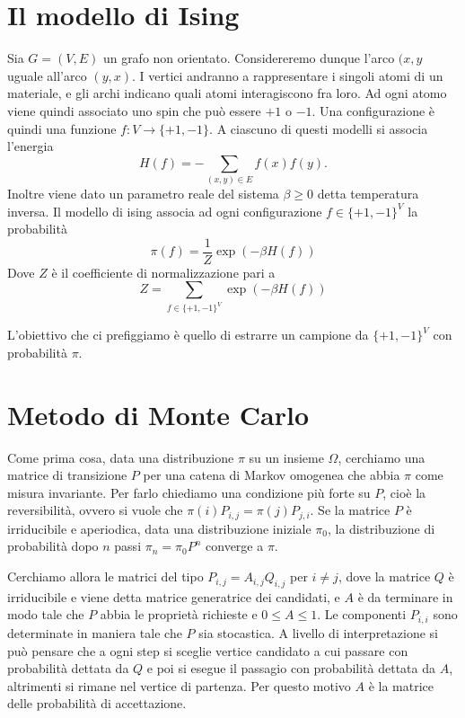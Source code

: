 \documentclass[]{marticle}
\begin{document}
\section{Il modello di Ising}
Sia $G=(V,E)$ un grafo non orientato. Considereremo dunque l'arco $(x,y$ uguale
all'arco $(y,x)$. I vertici andranno a rappresentare i singoli atomi di un
materiale, e gli archi indicano quali atomi interagiscono fra loro. Ad ogni
atomo viene quindi associato uno spin che pu\`o essere $+1$ o $-1$. Una
configurazione \`e quindi una funzione $f\colon V \rightarrow \{+1, -1\}$. A
ciascuno di questi modelli si associa l'energia 
\[
    H(f) = -\sum_{(x,y)\in E} f(x)f(y).
\]
Inoltre viene dato un parametro reale del sistema $\beta \geq 0$ detta
temperatura inversa. Il modello di ising associa ad ogni configurazione $f \in
\{+1, -1\}^V$ la probabilit\`a
\[
    \pi(f) = \frac{1}{Z} \exp(-\beta H(f))
\]
Dove $Z$ \`e il coefficiente di normalizzazione pari a
\[
    Z = \sum_{f \in \{+1,-1\}^V} \exp(-\beta H(f))
\]

L'obiettivo che ci prefiggiamo \`e quello di estrarre un campione da
$\{+1,-1\}^V$ con probabilit\`a $\pi$.

\section{Metodo di Monte Carlo}

Come prima cosa, data una distribuzione $\pi$ su un insieme $\Omega$, cerchiamo
una matrice di transizione $P$ per una catena di Markov omogenea che abbia
$\pi$ come misura invariante. Per farlo chiediamo una condizione pi\`u forte su
$P$, cio\`e la reversibilit\`a, ovvero si vuole che $\pi (i)P_{i,j}=\pi
(j)P_{j,i}$. Se la matrice $P$ \`e irriducibile e aperiodica, data una
distribuzione iniziale $\pi_0$, la distribuzione di probabilit\`a dopo $n$ passi
$\pi_n = \pi_0 P^n$ converge a $\pi$.

Cerchiamo allora le matrici del tipo $P_{i,j} = A_{i,j} Q_{i,j}$ per $i\neq j$,
dove la matrice $Q$ \`e irriducibile e viene detta matrice generatrice dei
candidati, e $A$ \`e da terminare in modo tale che $P$ abbia le propriet\`a
richieste e $0\leq A \leq 1$. Le componenti $P_{i,i}$ sono determinate in
maniera tale che $P$ sia stocastica.  A livello di interpretazione si pu\`o
pensare che a ogni step si sceglie vertice candidato a cui passare con
probabilit\`a dettata da $Q$ e poi si esegue il passagio con probabilit\`a
dettata da $A$, altrimenti si rimane nel vertice di partenza. Per questo motivo
$A$ \`e la matrice delle probabilit\`a di accettazione. 
\end{document}
